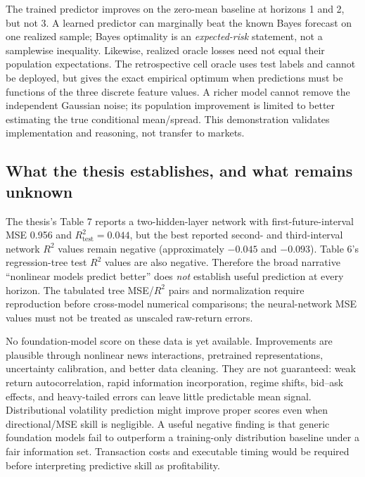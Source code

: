 \documentclass[11pt,letterpaper]{article}
\begin{document}
The trained predictor improves on the zero-mean baseline at horizons 1 and 2, but not 3. A learned predictor can marginally beat the known Bayes forecast on one realized sample; Bayes optimality is an \emph{expected-risk} statement, not a samplewise inequality. Likewise, realized oracle losses need not equal their population expectations. The retrospective cell oracle uses test labels and cannot be deployed, but gives the exact empirical optimum when predictions must be functions of the three discrete feature values. A richer model cannot remove the independent Gaussian noise; its population improvement is limited to better estimating the true conditional mean/spread. This demonstration validates implementation and reasoning, not transfer to markets.

\subsection{What the thesis establishes, and what remains unknown}
The thesis's Table 7 reports a two-hidden-layer network with first-future-interval MSE 0.956 and $R^2_{\mathrm{test}}=0.044$, but the best reported second- and third-interval network $R^2$ values remain negative (approximately $-0.045$ and $-0.093$). Table 6's regression-tree test $R^2$ values are also negative. Therefore the broad narrative ``nonlinear models predict better'' does \emph{not} establish useful prediction at every horizon. The tabulated tree MSE/$R^2$ pairs and normalization require reproduction before cross-model numerical comparisons; the neural-network MSE values must not be treated as unscaled raw-return errors.

No foundation-model score on these data is yet available. Improvements are plausible through nonlinear news interactions, pretrained representations, uncertainty calibration, and better data cleaning. They are not guaranteed: weak return autocorrelation, rapid information incorporation, regime shifts, bid--ask effects, and heavy-tailed errors can leave little predictable mean signal. Distributional volatility prediction might improve proper scores even when directional/MSE skill is negligible. A useful negative finding is that generic foundation models fail to outperform a training-only distribution baseline under a fair information set. Transaction costs and executable timing would be required before interpreting predictive skill as profitability.
\end{document}
